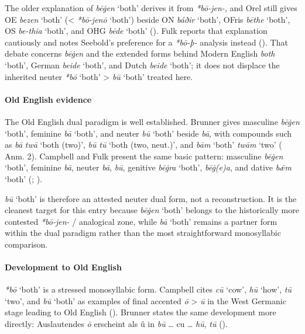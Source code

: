 \documentclass[
  british,
  a4paper,
]{article}
\providecommand{\Recon}[1]{\emph{*#1}}
\begin{document}
The older explanation of {\emph{bēġen}} `both' derives it from
\emph{*bō-jen-}, and Orel still gives OE {\emph{bezen}} `both'
(\textless{} \Recon{bō-jenō} `both') beside ON {\emph{báðir}} `both',
OFris {\emph{bēthe}} `both', OS {\emph{be-thia}} `both', and OHG
{\emph{bēde}} `both' (). Fulk
reports that explanation cautiously and notes Seebold's preference for a
\emph{*bō-þ-} analysis instead (). That debate concerns {\emph{bēġen}} and the extended forms
behind Modern English {\emph{both}} `both', German {\emph{beide}}
`both', and Dutch {\emph{beide}} `both'; it does not displace the
inherited neuter {\emph{*bō}} `both' \textgreater{} {\emph{bū}} `both'
treated here.

\paragraph{Old English evidence}\label{old-english-evidence-8}

The Old English dual paradigm is well established. Brunner gives
masculine {\emph{bēġen}} `both', feminine {\emph{bā}} `both', and neuter
{\emph{bū}} `both' beside \emph{bā}, with compounds such as \emph{bā}
\emph{twā} `both (two)', \emph{bū} \emph{tū} `both (two, neut.)', and
\emph{bām} `both' \emph{twām} `two'
( Anm. 2).
Campbell and Fulk present the same basic pattern: masculine
{\emph{bēġen}} `both', feminine \emph{bā}, neuter \emph{bā}, \emph{bū},
genitive \emph{bēġra} `both', \emph{bēġ(e)a}, and dative {\emph{bǣm}}
`both' (;
).

{\emph{bū}} `both' is therefore an attested neuter dual form, not a
reconstruction. It is the cleanest target for this entry because
{\emph{bēġen}} `both' belongs to the historically more contested
\emph{*bō-jen-} / analogical zone, while \emph{bā} `both' remains a
partner form within the dual paradigm rather than the most
straightforward monosyllabic comparison.

\paragraph{Development to Old
English}\label{development-to-old-english-8}

{\emph{*bō}} `both' is a stressed monosyllabic form. Campbell cites
\emph{cū} `cow', \emph{hū} `how', \emph{tū} `two', and {\emph{bū}}
`both' as examples of final accented \emph{ō} \textgreater{} \emph{ū} in
the West Germanic stage leading to Old English
(). Brunner states
the same development more directly: Auslautendes \emph{ō} erscheint als
û in \emph{bū} \ldots{} cu \ldots{} \emph{hū}, \emph{tū}
().
\end{document}
